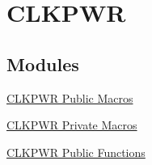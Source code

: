 \hypertarget{group___c_l_k_p_w_r}{\section{\-C\-L\-K\-P\-W\-R}
\label{group___c_l_k_p_w_r}
}
\subsection*{\-Modules}
\begin{DoxyCompactItemize}
\item 
\hyperlink{group___c_l_k_p_w_r___public___macros}{\-C\-L\-K\-P\-W\-R Public Macros}
\item 
\hyperlink{group___c_l_k_p_w_r___private___macros}{\-C\-L\-K\-P\-W\-R Private Macros}
\item 
\hyperlink{group___c_l_k_p_w_r___public___functions}{\-C\-L\-K\-P\-W\-R Public Functions}
\end{DoxyCompactItemize}
